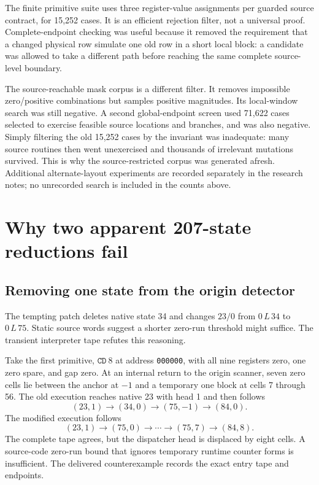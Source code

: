 \documentclass[11pt,a4paper]{article}
\theoremstyle{definition}
\newcommand{\CD}{\mathtt{CD}}
\begin{document}
The finite primitive suite uses three register-value assignments per guarded source contract, for 15,252 cases. It is an efficient rejection filter, not a universal proof. Complete-endpoint checking was useful because it removed the requirement that a changed physical row simulate one old row in a short local block: a candidate was allowed to take a different path before reaching the same complete source-level boundary.

The source-reachable mask corpus is a different filter. It removes impossible zero/positive combinations but samples positive magnitudes. Its local-window search was still negative. A second global-endpoint screen used 71,622 cases selected to exercise feasible source locations and branches, and was also negative. Simply filtering the old 15,252 cases by the invariant was inadequate: many source routines then went unexercised and thousands of irrelevant mutations survived. This is why the source-restricted corpus was generated afresh. Additional alternate-layout experiments are recorded separately in the research notes; no unrecorded search is included in the counts above.

\section{Why two apparent 207-state reductions fail}
\label{sec:counterexamples}

\subsection{Removing one state from the origin detector}

The tempting patch deletes native state 34 and changes $23/0$ from $0\,L\,34$ to $0\,L\,75$. Static source words suggest a shorter zero-run threshold might suffice. The transient interpreter tape refutes this reasoning.

Take the first primitive, $\CD\ 8$ at address \texttt{000000}, with all nine registers zero, one zero spare, and gap zero. At an internal return to the origin scanner, seven zero cells lie between the anchor at $-1$ and a temporary one block at cells 7 through 56. The old execution reaches native 23 with head 1 and then follows
\[
(23,1)\longrightarrow(34,0)\longrightarrow(75,-1)\longrightarrow(84,0).
\]
The modified execution follows
\[
(23,1)\longrightarrow(75,0)\longrightarrow\cdots
\longrightarrow(75,7)\longrightarrow(84,8).
\]
The complete tape agrees, but the dispatcher head is displaced by eight cells. A source-code zero-run bound that ignores temporary runtime counter forms is insufficient. The delivered counterexample records the exact entry tape and endpoints.
\end{document}
